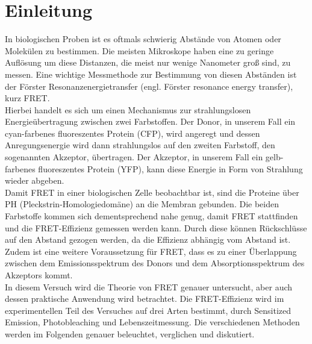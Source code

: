 \chapter{Einleitung}
In biologischen Proben ist es oftmals schwierig Abstände von Atomen oder Molekülen zu bestimmen. Die meisten Mikroskope haben
eine zu geringe Auflösung um diese Distanzen, die meist nur wenige Nanometer
groß sind, zu messen. 
Eine wichtige Messmethode zur Bestimmung von diesen Abständen ist der Förster Resonanzenergietransfer
(engl. Förster resonance energy transfer), kurz FRET.\\
Hierbei handelt es sich um einen Mechanismus zur strahlungslosen Energieübertragung zwischen zwei Farbstoffen.
Der Donor, in unserem Fall ein cyan-farbenes fluoreszentes Protein (CFP), wird angeregt und dessen Anregungsenergie
wird dann strahlungslos auf den zweiten Farbstoff, den sogenannten Akzeptor, übertragen. 
Der Akzeptor, in unserem Fall ein gelb-farbenes fluoreszentes Protein (YFP), kann diese Energie in Form von Strahlung 
wieder abgeben. \\
Damit FRET in einer biologischen Zelle beobachtbar ist, sind die Proteine über PH (Pleckstrin-Homologiedomäne) an
die Membran gebunden. Die beiden Farbstoffe kommen sich dementsprechend nahe genug, damit FRET stattfinden und die FRET-Effizienz gemessen werden kann. 
Durch diese können Rückschlüsse auf den Abstand gezogen werden, da die Effizienz abhängig vom Abstand ist. 
Zudem ist eine weitere Voraussetzung für FRET, dass es zu einer Überlappung zwischen dem Emissionsspektrum 
des Donors und dem Absorptionsspektrum des Akzeptors kommt. \\
In diesem Versuch wird die Theorie von FRET genauer untersucht, aber auch dessen praktische Anwendung wird betrachtet.
Die FRET-Effizienz wird im experimentellen Teil des Versuches auf drei Arten bestimmt, durch Sensitized Emission, Photobleaching und Lebenszeitmessung. 
Die verschiedenen Methoden werden im Folgenden genauer beleuchtet, verglichen und diskutiert.
